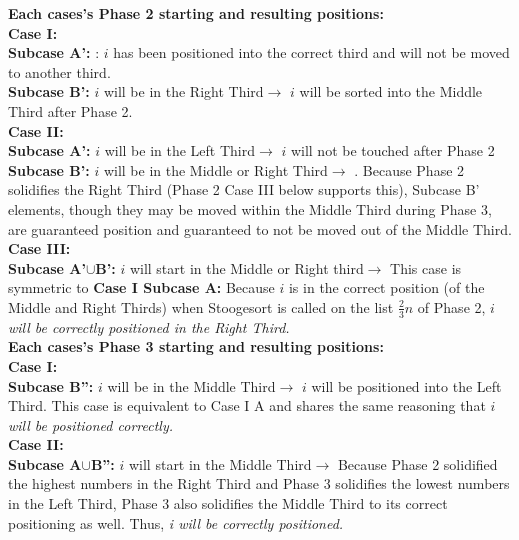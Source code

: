 \documentclass[11pt, solution, letterpaper]{format}
\begin{document}
\textbf{Each cases's Phase 2 starting and resulting positions:}\\
\textbf{Case I:}\\
    \textbf{Subcase A':} :
    $i$ has been positioned into the correct third and will not be moved to another third.\\
    \textbf{Subcase B':} $i$ will be in the Right Third$\rightarrow$ $i$ will be sorted into the Middle Third after Phase 2.\\
\textbf{Case II:}\\
    \textbf{Subcase A':} $i$ will be in the Left Third$\rightarrow$ $i$ will not be touched after Phase 2 \\
    \textbf{Subcase B':} $i$ will be in the Middle or Right Third$\rightarrow$ . Because Phase 2 solidifies the Right Third (Phase 2 Case III below supports this), Subcase B' elements, though they may be moved within the Middle Third during Phase 3, are guaranteed position and guaranteed to not be moved out of the Middle Third.\\
\textbf{Case III:}\\
    \textbf{Subcase A'$\cup$B':} $i$ will start in the Middle or Right third$\rightarrow$ This case is symmetric to \textbf{Case I Subcase A:} Because $i$ is in the correct position (of the Middle and Right Thirds) when Stoogesort is called on the list $\frac{2}{3}n$ of Phase 2, \emph{$i$ will be correctly positioned in the Right Third.} \\

\textbf{Each cases's Phase 3 starting and resulting positions:}\\
\textbf{Case I:}\\
    \textbf{Subcase B'':} $i$ will be in the Middle Third$\rightarrow$ $i$ will be positioned into the Left Third. This case is equivalent to Case I A and shares the same reasoning that \emph{$i$ will be positioned correctly.} \\
\textbf{Case II:}\\
    \textbf{Subcase A$\cup$B'':} $i$ will start in the Middle Third$\rightarrow$ Because Phase 2 solidified the highest numbers in the Right Third and Phase 3 solidifies the lowest numbers in the Left Third, Phase 3 also solidifies the Middle Third to its correct positioning as well. Thus, \emph{i will be correctly positioned.} \\

    
  
\end{document}
